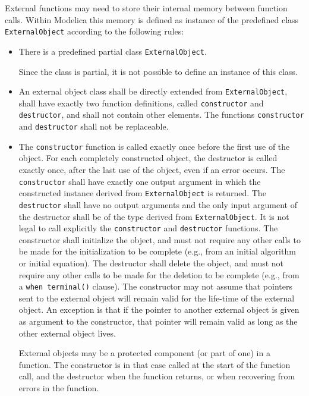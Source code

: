 External functions may need to store their internal memory between function calls.
Within Modelica this memory is defined as instance of the
predefined class \lstinline!ExternalObject! according to the following rules:
\begin{itemize}
\item
  There is a predefined partial class \lstinline!ExternalObject!.
  \begin{nonnormative}
  Since the class is partial, it is not possible to define an instance of this class.
  \end{nonnormative}
\item
  An external object class shall be directly extended from
  \lstinline!ExternalObject!, shall have exactly two function definitions, called
  \lstinline!constructor! and \lstinline!destructor!, and shall not contain other elements.
  The functions \lstinline!constructor! and \lstinline!destructor! shall not be replaceable.
\item
  The \lstinline!constructor! function is called exactly once before the first use
  of the object. For each completely constructed object, the destructor
  is called exactly once, after the last use of the object, even if an
  error occurs. The \lstinline!constructor! shall have exactly one output argument
  in which the constructed instance derived from \lstinline!ExternalObject! is
  returned. The \lstinline!destructor! shall have no output arguments and the only
  input argument of the destructor shall be of the type derived from
  \lstinline!ExternalObject!. It is not legal to call explicitly the \lstinline!constructor! and
  \lstinline!destructor! functions. The constructor shall initialize the object, and
  must not require any other calls to be made for the initialization to
  be complete (e.g., from an initial algorithm or initial equation). The
  destructor shall delete the object, and must not require any other
  calls to be made for the deletion to be complete (e.g., from a \lstinline!when terminal()! clause). The constructor may not assume that pointers sent
  to the external object will remain valid for the life-time of the external object.  An exception is that if the pointer to another external object is
  given as argument to the constructor, that pointer will remain valid as long as the other external object lives.
  \begin{nonnormative}
  External objects may be a protected component (or part of one) in a function.  The constructor is in that case called at the start of the function call,
  and the destructor when the function returns, or when recovering from errors in the function.

\end{nonnormative}
\end{itemize}
